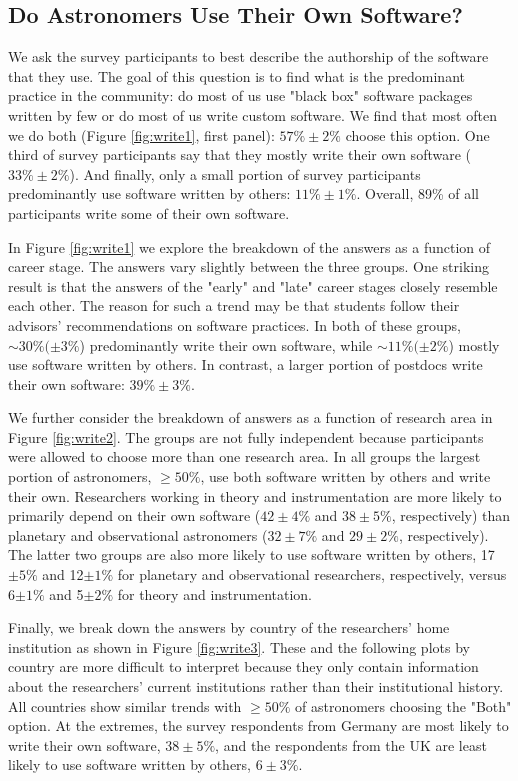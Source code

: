 \subsection{Do Astronomers Use Their Own Software?}

We ask the survey participants to best describe the authorship of the software that they use. The goal of this question is to find what is the predominant practice in the community: do most of us use "black box" software packages written by few or do most of us write custom software. We find that most often we do both (Figure \ref{fig:write1}, first panel): $57\%\pm2\%$ choose this option. One third of survey participants say that they mostly write their own software ($33\%\pm2\%$). And finally, only a small portion of survey participants predominantly use software written by others: $11\%\pm1\%$. Overall, 89\% of all participants write some of their own software.

In Figure \ref{fig:write1} we explore the breakdown of the answers as a function of career stage. The answers vary slightly between the three groups. One striking result is that the answers of the "early" and "late" career stages closely resemble each other. The reason for such a trend may be that students follow their advisors' recommendations on software practices. In both of these groups, $\sim30\%(\pm3\%$) predominantly write their own software, while $\sim11\%(\pm2\%$) mostly use software written by others. In contrast, a larger portion of postdocs write their own software: $39\%\pm3\%$. 

We further consider the breakdown of answers as a function of research area in Figure \ref{fig:write2}. The groups are not fully independent because participants were allowed to choose more than one research area. In all groups the largest portion of astronomers, $\ge50\%$, use both software written by others and write their own. Researchers working in theory and instrumentation are more likely to primarily depend on their own software ($42\pm4\%$ and $38\pm5\%$, respectively) than planetary and observational astronomers ($32\pm7\%$ and $29\pm2\%$, respectively). The latter two groups are also more likely to use software written by others, 17$\pm5\%$ and 12$\pm1\%$ for planetary and observational researchers, respectively, versus 6$\pm1\%$ and 5$\pm2\%$ for theory and instrumentation.

Finally, we break down the answers by country of the researchers' home institution as shown in Figure \ref{fig:write3}. These and the following plots by country are more difficult to interpret because they only contain information about the researchers' current institutions rather than their institutional history. All countries show similar trends with $\ge50\%$ of astronomers choosing the "Both" option. At the extremes, the survey respondents from Germany are most likely to write their own software, $38\pm5\%$, and the respondents from the UK are least likely to use software written by others, $6\pm3\%$.